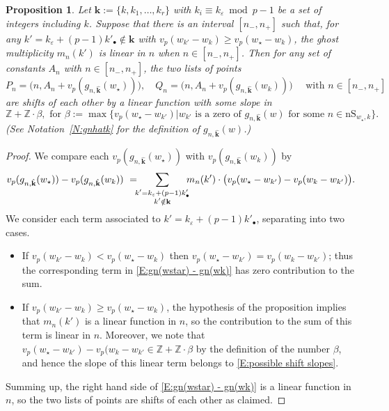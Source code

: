 \documentclass[12pt]{amsart}
\newtheorem{proposition}[subsection]{Proposition}
\theoremstyle{definition}
\numberwithin{equation}{subsection}
\def\ZZ{\mathbb{Z}}
\def\bfk{\mathbf{k}}
\newcommand{\nS}{\mathrm{nS}}
\begin{document}
\begin{proposition}
\label{P:shifting points wstar to wk_part4}
Let $\bfk :=\{k, k_1, \dots, k_r\}$ with $k_i \equiv k_\varepsilon \bmod p-1$ be a set of integers including $k$.
Suppose that there is an interval $[n_-,n_+]$ such that, for any $k' = k_\varepsilon + (p-1)k'_\bullet \notin \bfk$ with $v_p(w_{k'}-w_k) \geq v_p(w_\star - w_k)$, the ghost multiplicity $m_n(k')$ is linear in $n$ when $n \in [n_-,n_+]$. 
Then for any set of constants $A_n$ with $n \in [n_-,n_+]$, the two lists of points
$$
P_n = \big(n, A_n+v_p(g_{n,\hat {\bfk}}(w_\star))\big), \quad Q_n = \big(n, A_n+v_p(g_{n,\hat {\bfk}}(w_k))\big)  \quad \textrm{ with }n \in [ n_-,n_+]
$$
are shifts of each other by a linear function with some slope in 
\begin{equation}
\label{E:possible shift slopes general case}
\ZZ + \ZZ\cdot\beta, \text{~for~} \beta:= \max \{ v_p(w_\star - w_{k'})| w_{k'} \text{~is a zero of~} g_{n,\hat{\bfk}}(w) \text{~for some~} n\in \nS_{w_\star,k} \}.
\end{equation}
(See Notation~\ref{N:gnhatk} for the definition of $g_{n,\hat {\bfk}}(w)$.)
\end{proposition}
\begin{proof}
We compare each $v_p(g_{n,\hat {\bfk}}(w_\star))$ with $v_p(g_{n,\hat {\bfk}}(w_k))$ by
\begin{equation}
\label{E:gn(wstar) - gn(wk)}
v_p(g_{n,\hat {\bfk}}(w_\star))  - v_p(g_{n,\hat {\bfk}}(w_k))\ =\hspace{-5pt} \sum_{\substack{k'= k_\varepsilon+(p-1)k'_\bullet \\ k'  \notin \bfk}}\hspace{-5pt} m_n(k')\cdot \big( v_p(w_\star - w_{k'}) - v_p(w_k-w_{k'}  ) \big).
\end{equation}
We consider each term associated to $k' = k_\varepsilon + (p-1)k'_\bullet$, separating into two cases.
\begin{itemize}
\item 
If $v_p(w_{k'} - w_k)  <v_p(w_\star - w_k)$ then  $v_p(w_\star - w_{k'} ) = v_p(w_k - w_{k'})$; thus the corresponding term in \eqref{E:gn(wstar) - gn(wk)} has zero contribution to the sum.
\item
If $v_p(w_{k'} - w_k)  \geq v_p(w_\star - w_k)$, the hypothesis of the proposition implies that $m_n(k')$ is a linear function in $n$, so the contribution to the sum of this term is linear in $n$.  Moreover, we note that $v_p(w_\star - w_{k'}) - v_p(w_k-w_{k'} \in \ZZ+\ZZ\cdot \beta$ by the definition of the number $\beta$, and hence  the slope of this linear term belongs to \eqref{E:possible shift slopes}.
\end{itemize}
Summing up, the right hand side of \eqref{E:gn(wstar) - gn(wk)} is a linear function in $n$, so the two lists of points are shifts of each other as claimed.
\end{proof}
\end{document}
